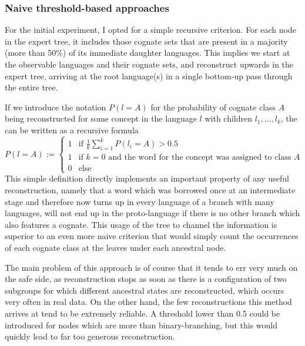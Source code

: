 \subsubsection{Naive threshold-based approaches}
For the initial experiment, I opted for a simple recursive criterion. For each node in the expert tree, it includes those cognate sets that are present in a majority (more than 50\%) of its immediate daughter languages. This implies we start at the observable languages and their cognate sets, and reconstruct upwards in the expert tree, arriving at the root language(s) in a single bottom-up pass through the entire tree.

If we introduce the notation $P(l = A)$ for the probability of cognate class $A$ being reconstructed for some concept in the language $l$ with children $l_1,\dots,l_k$, the  can be written as a recursive formula
\begin{equation*}
   P(l = A) :=
   \begin{cases}
     1 & \text{if } \frac{1}{k} \sum_{i=1}^k P(l_i = A) > 0.5\\
     1 & \text{if } k = 0 \text{ and the word for the concept was assigned to class } A\\
     0 & \text{else }
   \end{cases}
\end{equation*}
\linebreak
This simple definition directly implements an important property of any useful reconstruction, namely that a word which was borrowed once at an intermediate stage and therefore now turns up in every language of a branch with many languages, will not end up in the proto-language if there is no other branch which also features a cognate. This usage of the tree to channel the information is superior to an even more naive criterion that would simply count the occurrences of each cognate class at the leaves under each ancestral node.

The main problem of this approach is of course that it tends to err very much on the safe side, as reconstruction stops as soon as there is a configuration of two subgroups for which different ancestral states are reconstructed, which occurs very often in real data. On the other hand, the few reconstructions this method arrives at tend to be extremely reliable. A threshold lower than 0.5 could be introduced for nodes which are more than binary-branching, but this would quickly lead to far too generous reconstruction.


